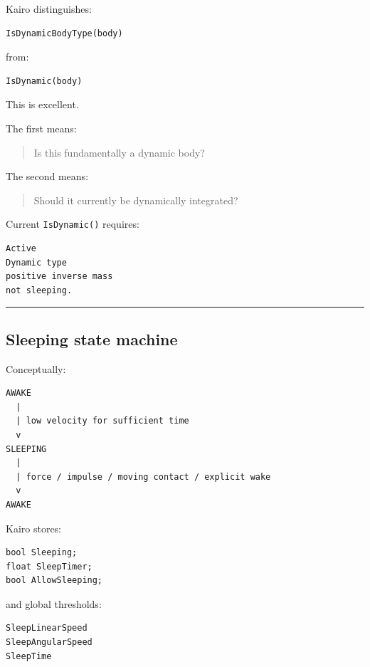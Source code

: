 Kairo distinguishes:

\begin{verbatim}
IsDynamicBodyType(body)
\end{verbatim}

from:

\begin{verbatim}
IsDynamic(body)
\end{verbatim}

This is excellent.

The first means:

\begin{quote}
Is this fundamentally a dynamic body?
\end{quote}

The second means:

\begin{quote}
Should it currently be dynamically integrated?
\end{quote}

Current \texttt{IsDynamic()} requires:

\begin{verbatim}
Active
Dynamic type
positive inverse mass
not sleeping.
\end{verbatim}

\begin{center}\rule{0.5\linewidth}{0.5pt}\end{center}

\subsection{Sleeping state machine}\label{06-engine-ii-ch037-sleeping-state-machine}

Conceptually:

\begin{verbatim}
AWAKE
  |
  | low velocity for sufficient time
  v
SLEEPING
  |
  | force / impulse / moving contact / explicit wake
  v
AWAKE
\end{verbatim}

Kairo stores:

\begin{verbatim}
bool Sleeping;
float SleepTimer;
bool AllowSleeping;
\end{verbatim}

and global thresholds:

\begin{verbatim}
SleepLinearSpeed
SleepAngularSpeed
SleepTime
\end{verbatim}

